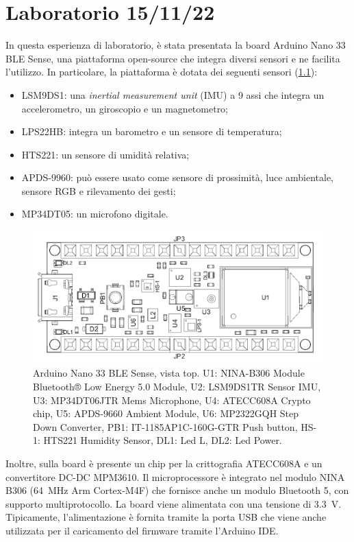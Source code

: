 \chapter{Laboratorio 15/11/22}
In questa esperienza di laboratorio, è stata presentata la board Arduino Nano 33 BLE Sense, una piattaforma open-source che integra diversi sensori e ne facilita l'utilizzo. In particolare, la piattaforma è dotata dei seguenti sensori (\Fig\ref{fig:arduino}):
\begin{itemize}
	\item LSM9DS1: una \textit{inertial measurement unit} (IMU) a 9 assi che integra un accelerometro, un giroscopio e un magnetometro;
	\item LPS22HB: integra un barometro e un sensore di temperatura;
	\item HTS221: un sensore di umidità relativa;
	\item APDS-9960: può essere usato come sensore di prossimità, luce ambientale, sensore RGB e rilevamento dei gesti;
	\item MP34DT05: un microfono digitale.
\end{itemize}
\begin{figure}[b!]
	\centering
	\includegraphics[width=0.8\linewidth]{./ImageFiles/arduino.png}
	\caption{Arduino Nano 33 BLE Sense, vista top. U1: NINA-B306 Module Bluetooth® Low Energy 5.0 Module, U2: LSM9DS1TR Sensor IMU, U3: MP34DT06JTR Mems Microphone, U4: ATECC608A Crypto chip, U5: APDS-9660 Ambient Module, U6: MP2322GQH Step Down Converter, PB1: IT-1185AP1C-160G-GTR Push button, HS-1: HTS221 Humidity Sensor, DL1: Led L, DL2: Led Power.}
	\label{fig:arduino}
\end{figure}
Inoltre, sulla board è presente un chip per la crittografia ATECC608A e un convertitore DC-DC MPM3610. Il microprocessore è integrato nel modulo NINA B306 (\SI{64}{\mega\hertz} Arm Cortex-M4F) che fornisce anche un modulo Bluetooth 5, con supporto multiprotocollo. La board viene alimentata con una tensione di \SI{3.3}{\volt}. Tipicamente, l'alimentazione è fornita tramite la porta USB che viene anche utilizzata per il caricamento del firmware tramite l'Arduino IDE.

